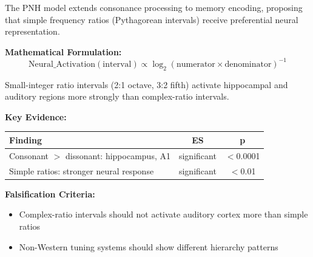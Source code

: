 \documentclass[9pt,onecolumn]{article}
\begin{document}
The PNH model extends consonance processing to memory encoding, proposing that simple frequency ratios (Pythagorean intervals) receive preferential neural representation.

\textbf{Mathematical Formulation:}
\begin{equation}
\text{Neural\_Activation}(\text{interval}) \propto \log_2(\text{numerator} \times \text{denominator})^{-1}
\label{eq:pnh}
\end{equation}

Small-integer ratio intervals (2:1 octave, 3:2 fifth) activate hippocampal and auditory regions more strongly than complex-ratio intervals.

\textbf{Key Evidence:}
\begin{center}
\small
\begin{tabular}{@{}lcc@{}}
\toprule
\textbf{Finding} & \textbf{ES} & \textbf{p} \\
\midrule
Consonant $>$ dissonant: hippocampus, A1 & significant & $<$0.0001 \\
Simple ratios: stronger neural response & significant & $<$0.01 \\
\bottomrule
\end{tabular}
\end{center}

\textbf{Falsification Criteria:}
\begin{itemize}[leftmargin=*, topsep=0pt, itemsep=0pt]
\item Complex-ratio intervals should not activate auditory cortex more than simple ratios
\item Non-Western tuning systems should show different hierarchy patterns
\end{itemize}
\end{document}
